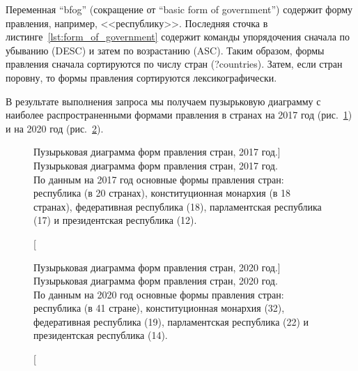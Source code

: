 \newpage
Переменная ``bfog'' (сокращение от ``basic form of government'') содержит форму правления, например, <<республику>>. 
Последняя сточка в листинге~\ref{lst:form_of_government} содержит команды упорядочения сначала по убыванию (DESC) и затем по возрастанию (ASC). Таким образом, формы правления сначала сортируются по числу стран (?countries). Затем, если стран поровну, то формы правления сортируются  лексикографически\protect\footnotemark. 


В результате выполнения запроса мы получаем пузырьковую диаграмму с наиболее распространенными формами правления в странах на 2017 год (рис.~\ref{fig:bubble_chart_forms_of_government_countries_2017}) и на 2020 год (рис.~\ref{fig:bubble_chart_forms_of_government_countries_2020}).

\begin{figure}
	{
		\setlength{\fboxsep}{0pt}%
		\setlength{\fboxrule}{1pt}%
	}
	\caption
	[Пузырьковая диаграмма форм правления стран, 2017 год.]
	{Пузырьковая диаграмма форм правления стран, 2017 год.
		\\			
		По данным на 2017 год основные формы правления стран: республика (в 20 странах), конституционная монархия (в 18 странах), федеративная республика (18), парламентская республика (17) и президентская республика (12).}%
	\label{fig:bubble_chart_forms_of_government_countries_2017}%
\end{figure}

\begin{figure}
	{
		\setlength{\fboxsep}{0pt}%
		\setlength{\fboxrule}{1pt}%
	}
	\caption
	[Пузырьковая диаграмма форм правления стран, 2020 год.]
	{Пузырьковая диаграмма форм правления стран, 2020 год.
	\\
	По данным на 2020 год  основные формы правления стран: республика (в 41 стране), конституционная монархия (32), федеративная республика (19), парламентская республика (22) и президентская республика (14).
}%
	\label{fig:bubble_chart_forms_of_government_countries_2020}%
\end{figure}

